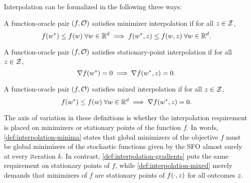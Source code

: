 Interpolation can be formalized in the following three ways:
\begin{definition}\label{def:interpolation-minima}
    A function-oracle pair \( (f, \oracle{}) \) satisfies minimizer interpolation if for all \( \z \in \calZ \),
    \[ f(\wopt) \leq f(\w) \; \forall \w \in \R^d \implies f(\wopt, \z) \leq f(\w, \z) \; \forall \w \in \R^d.  \]
\end{definition}
\begin{definition}\label{def:interpolation-gradients}
    A function-oracle pair \( (f, \oracle{}) \) satisfies stationary-point interpolation if for all \( \z \in \calZ \),
    \[ \grad(\wopt) = 0 \implies \grad(\wopt, \z) = 0. \]
\end{definition}
\begin{definition}\label{def:interpolation-mixed}
    A function-oracle pair \( (f, \oracle{}) \) satisfies mixed interpolation if for all \( \z \in \calZ \),
    \[ f(\wopt) \leq f(\w) \; \forall \w \in \R^d \implies \grad(\wopt, \z) = 0. \]
\end{definition}
The axis of variation in these definitions is whether the interpolation requirement is placed on minimizers or stationary points of the function \( f \).
In words, \autoref{def:interpolation-minima} states that global minimizers of the objective \( f \) must be global minimizers of the stochastic functions given by the \ac{SFO} almost surely at every iteration \( k \).
In contrast, \autoref{def:interpolation-gradients} puts the same requirement on stationary points of \( f \), while \autoref{def:interpolation-mixed} merely demands that minimizers of \( f \) are stationary points of \( f(\cdot, \z) \) for all outcomes \( \z \).

